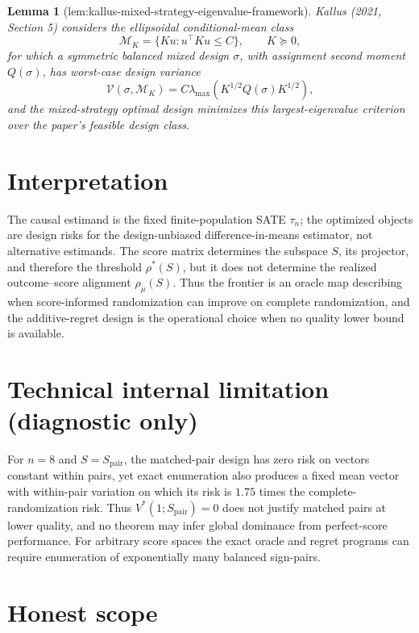 \documentclass{article}
\newtheorem{lemma}{Lemma}
\begin{document}
\begin{lemma}[lem:kallus-mixed-strategy-eigenvalue-framework]\label{lem:kallus-mixed-strategy-eigenvalue-framework}
Kallus (2021, Section 5) considers the ellipsoidal conditional-mean class
\[
\mathcal M_K=\{Ku:u^\top Ku\leq C\},
\qquad K\succeq0,
\]
for which a symmetric balanced mixed design \(\sigma\), with assignment second moment \(Q(\sigma)\), has worst-case design variance
\[
\mathcal V(\sigma,\mathcal M_K)
=C\lambda_{\max}\!\left(K^{1/2}Q(\sigma)K^{1/2}\right),
\]
and the mixed-strategy optimal design minimizes this largest-eigenvalue criterion over the paper's feasible design class.
\end{lemma}

\section{Interpretation}

The causal estimand is the fixed finite-population SATE \(\tau_n\); the optimized objects are design risks for the design-unbiased difference-in-means estimator, not alternative estimands. The score matrix determines the subspace \(S\), its projector, and therefore the threshold \(\rho^*(S)\), but it does not determine the realized outcome--score alignment \(\rho_{\mu}(S)\). Thus the frontier is an oracle map describing when score-informed randomization can improve on complete randomization, and the additive-regret design is the operational choice when no quality lower bound is available.

\section*{Technical internal limitation (diagnostic only)}

For \(n=8\) and \(S=S_{\mathrm{pair}}\), the matched-pair design has zero risk on vectors constant within pairs, yet exact enumeration also produces a fixed mean vector with within-pair variation on which its risk is \(1.75\) times the complete-randomization risk. Thus \(V^*(1;S_{\mathrm{pair}})=0\) does not justify matched pairs at lower quality, and no theorem may infer global dominance from perfect-score performance. For arbitrary score spaces the exact oracle and regret programs can require enumeration of exponentially many balanced sign-pairs.

\section{Honest scope}
\end{document}
